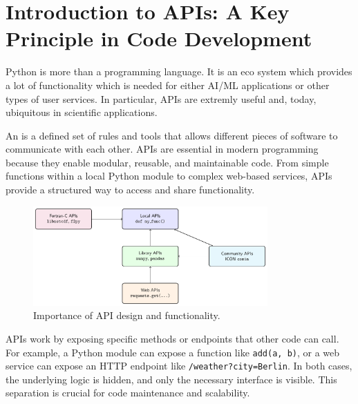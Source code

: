 %
\section{Introduction to APIs: A Key Principle in Code Development}

Python is more than a programming language. It is an eco system which provides a lot of functionality which is needed for either AI/ML applications or other types of user services. In particular, APIs are extremly useful and, today, ubiquitous in scientific applications. 

An  is a defined set of rules and tools that allows different pieces of software to communicate with each other. APIs are essential in modern programming because they enable modular, reusable, and maintainable code. From simple functions within a local Python module to complex web-based services, APIs provide a structured way to access and share functionality.

\begin{center}
\begin{figure}[ht]
   \centerline{\includegraphics[width=0.8\textwidth]{chapters/api_diagram.pdf}}
	\caption{Importance of API design and functionality.}
\end{figure}
\end{center}%

APIs work by exposing specific methods or endpoints that other code can call. For example, a Python module can expose a function like \texttt{add(a, b)}, or a web service can expose an HTTP endpoint like \texttt{/weather?city=Berlin}. In both cases, the underlying logic is hidden, and only the necessary interface is visible. This separation is crucial for code maintenance and scalability.

%
